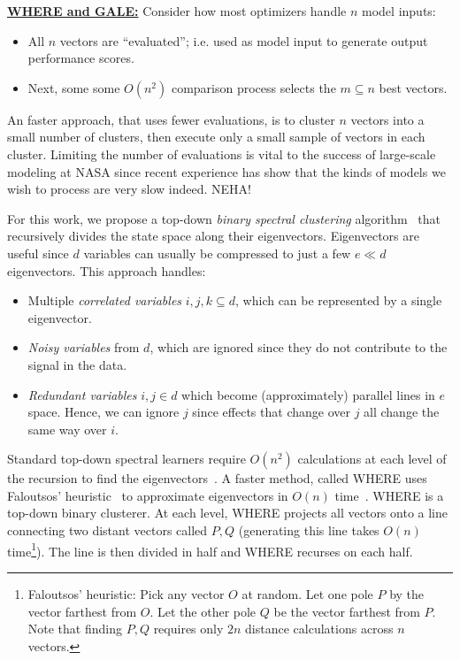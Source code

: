 \documentclass[12pt]{article}
\newcommand{\bi}{\begin{itemize}[leftmargin=0.5cm]}
\newcommand{\ei}{\end{itemize}}
\begin{document}
\underline{{\bf WHERE and GALE:}} 
Consider 
how most optimizers handle  $n$ model inputs:
\bi
\item
 All $n$ vectors are ``evaluated''; i.e. used as model input to
 generate   output performance scores. 
\item
Next, some   some $O(n^2)$ comparison process  selects the $m \subseteq n$ best vectors.
\ei
An faster approach, that uses fewer evaluations, is to cluster $n$ vectors
into a small number of clusters, then
 execute only a small sample of vectors in each cluster.
 Limiting the number of evaluations is vital to the success of large-scale modeling
 at NASA since recent experience has show that the kinds of models we wish to process
 are very slow indeed. NEHA!
 
 
For this work, we propose a top-down  {\em binary spectral clustering} algorithm~\cite{kamvar03} 
that recursively divides
the state space along their eigenvectors. Eigenvectors are useful since 
  $d$ variables can usually be compressed to just
  a few $e \ll d$ eigenvectors. This approach handles:
\bi
\item
Multiple {\em correlated variables} $i,j,k \subseteq d$, which can be represented
by a single  eigenvector.
\item
{\em Noisy variables} from $d$, which are 
ignored since they  do not contribute to the signal in the data.
\item
{\em Redundant  variables} \mbox{$i,j \in d$} which become (approximately) parallel lines
in $e$ space. Hence, we 
can ignore $j$ 
since effects that change over $j$ all
change   the same way over $i$.
\ei
Standard top-down spectral learners require  $O(n^2)$ calculations at each level 
of the recursion to find the eigenvectors~\cite{boley98}. A faster method, called WHERE 
uses Faloutsos'  heuristic~\cite{Faloutsos1995} to
approximate eigenvectors   in $O(n)$ time~\cite{platt05}.
WHERE  is a top-down binary clusterer.  
At each level, WHERE  projects all  vectors onto a line connecting two distant vectors called $P,Q$ (generating this line takes $O(n)$ time\footnote{Faloutsos’ heuristic: Pick any vector $O$ at random. Let one pole $P$ by the
vector farthest from $O$. Let the other pole $Q$ be the vector farthest from $P$. Note that
finding $P,Q$ requires only $2n$ distance calculations across $n$ vectors.}).
The line is then divided in half
and WHERE recurses on each half. 
\end{document}
